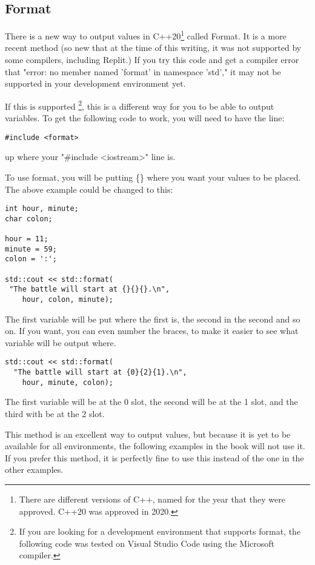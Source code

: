 \subsection{Format}
There is a new way to output values in C++20\footnote{There are different
versions of C++, named for the year that they were approved. C++20 was
approved in 2020.} called Format. It is a
more recent method (so new that at the time of this writing, it was not
supported by some compilers, including Replit.) If 
you try this code and get a compiler error that "error: no member 
named 'format' in namespace 'std'," it may not be supported in your development environment yet.

If this is supported \footnote{If you are looking for a development
environment that supports format, the following code 
was tested on Visual Studio Code using the Microsoft compiler.}, this is a different way for you to be able
to output variables. To get the following code to work,
you will need to have the line:
\begin{lstlisting}
#include <format>  
\end{lstlisting}
up where your "\#include \textless iostream\textgreater" line is.

To use format, you will be putting \{\} where you want your values
to be placed. The above example could be changed to this:
\begin{lstlisting}
int hour, minute;
char colon;

hour = 11;
minute = 59;
colon = ':';

std::cout << std::format(
 "The battle will start at {}{}{}.\n", 
    hour, colon, minute);
\end{lstlisting}
The first variable will be put where the first {} is, the second in
the second {} and so on. If you want, you can even number the 
braces, to make it easier to see what variable will be output where.
\begin{lstlisting}
std::cout << std::format(
  "The battle will start at {0}{2}{1}.\n", 
    hour, minute, colon);  
\end{lstlisting}
The first variable will be at the 0 slot, the second will be at the
1 slot, and the third with be at the 2 slot. 

This method is an excellent way to output values, but because it is yet to be available
for all environments, the following examples in the book will not use it. If you prefer this method, it is perfectly fine to use this instead of the one in the other examples.

